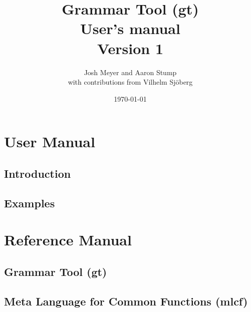 \documentclass{report}
\begin{document}
\date{}
\title{
{\Huge \bf Grammar Tool (gt)}\\
{User's manual}\\
{Version 1}\\
}

\author{
Josh Meyer and Aaron Stump\\
{with contributions from Vilhelm Sj\"{o}berg}
}

\date{\today}
\maketitle

\tableofcontents

\part{User Manual}

\chapter{Introduction}


\chapter{Examples}


\part{Reference Manual}

\chapter{Grammar Tool (gt)}


\chapter{Meta Language for Common Functions (mlcf)}

\end{document}
